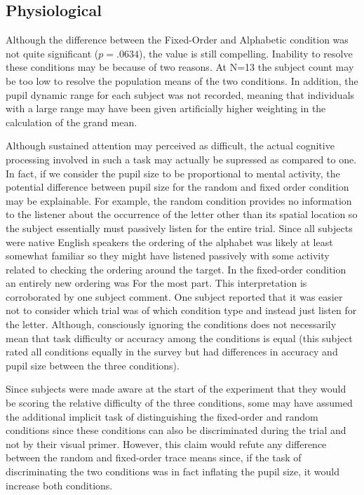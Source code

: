 \documentclass[10pt]{article}
\begin{document}
\subsection{Physiological}
Although the difference between the Fixed-Order and Alphabetic
condition was not quite significant ($p=.0634$), the value is
still compelling.  Inability to resolve these conditions may be
because of two reasons.  At N=13 the subject count may be too low to
resolve the population means of the two conditions. In addition, the
pupil dynamic range for each subject was not recorded, meaning that
individuals with a large range may have been given artificially higher
weighting in the calculation of the grand mean.

Although sustained
attention may perceived as difficult, the actual cognitive
processing involved in such a task may actually be supressed as
compared to one.  In fact, if we consider the pupil size to be
proportional to mental activity, the potential difference between
pupil size for the random and fixed order condition may be
explainable.  For example, the random condition provides no
information to the listener about the occurrence of the letter other
than its spatial location so the subject essentially must passively
listen for the entire trial.  Since all subjects were native English
speakers the ordering of the alphabet was likely at least somewhat
familiar so they might have listened passively with some activity
related to checking the ordering around the target.  In the
fixed-order condition an entirely new ordering was For the most
part.  This interpretation is corroborated by one subject comment.
One subject reported that it was easier not to consider which trial
was of which condition type and instead just listen for the letter.
Although, consciously ignoring the conditions does not necessarily
mean that task difficulty or accuracy among the conditions is equal
(this subject rated all conditions equally in the survey but had
differences in accuracy and pupil size between the three
conditions).

Since subjects were made aware at the start of the experiment that
they would be scoring the relative difficulty of the three
conditions, some may have assumed the additional implicit task of
distinguishing the fixed-order and random conditions since these
conditions can also be discriminated during the trial and not by
their visual primer.  However, this claim would refute any
difference between the random and fixed-order trace means since, if
the task of discriminating the two conditions was in fact inflating
the pupil size, it would increase both conditions. 
\end{document}
